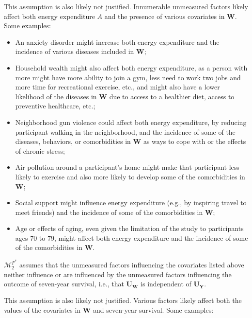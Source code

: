 \documentclass{article}\usepackage[]{graphicx}\usepackage[]{xcolor}
\begin{document}
\begin{enumerate}[label=\textbf{\arabic*.}]
\begin{enumerate}[label=\textbf{(\alph*)}]
This assumption is also likely not justified. Innumerable unmeasured factors likely affect both energy expenditure $A$ and the presence of various covariates in $\bm{W}$. Some examples:

\begin{itemize}
  \item An anxiety disorder might increase both energy expenditure and the incidence of various diseases included in $\bm{W}$;
  \item Household wealth might also affect both energy expenditure, as a person with more might have more ability to join a gym, less need to work two jobs and more time for recreational exercise, etc., and might also have a lower likelihood of the diseases in $\bm{W}$ due to access to a healthier diet, access to preventive healthcare, etc.; 
  \item Neighborhood gun violence could affect both energy expenditure, by reducing participant walking in the neighborhood, and the incidence of some of the diseases, behaviors, or comorbidities in $\bm{W}$ as ways to cope with or the effects of chronic stress;
  \item Air pollution around a participant's home might make that participant less likely to exercise and also more likely to develop some of the comorbidities in $\bm{W}$;
  \item Social support might influence energy expenditure (e.g., by inspiring travel to meet friends) and the incidence of some of the comorbidities in $\bm{W}$;
  \item Age or effects of aging, even given the limitation of the study to participants ages 70 to 79, might affect both energy expenditure and the incidence of some of the comorbidities in $\bm{W}$.
\end{itemize}

$\mathcal{M}^{F^*}_2$ assumes that the unmeasured factors influencing the covariates listed above neither influence or are influenced by the unmeasured factors influencing the outcome of seven-year survival, i.e., that $\bm{U_W}$ is independent of $\bm{U_Y}$.

This assumption is also likely not justified. Various factors likely affect both the values of the covariates in $\bm{W}$ and seven-year survival. Some examples:


\end{enumerate}
\end{enumerate}
\end{document}
